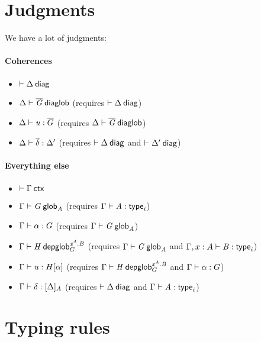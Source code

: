 \newcommand\diagbase[0]{\ensuremath{\mathord{*}}}
\newcommand\interpdiag[2]{\ensuremath{[ #1 ]_{#2}}}

\section{Judgments}

We have a lot of judgments:

\paragraph{Coherences}

\begin{itemize}
\item $\wfdiag{\Delta}$
\item $\wfdiaglob{\Delta}{\diag G}$ (requires $\wfdiag{\Delta}$)
\item $\ofdiaglob{\Delta}{u}{\diag G}$ (requires $\wfdiaglob{\Delta}{\diag G}$)
\item $\substdiaglob{\Delta}{\diag \delta}{\Delta'}$ (requires $\wfdiag{\Delta}$
  and $\wfdiag{\Delta'}$)
\end{itemize}

\paragraph{Everything else}

\begin{itemize}
\item $\wfctx{\Gamma}$
\item $\wfglob{\Gamma}{G}{}{A}$ (requires $\ofglob{\Gamma}{A}{\typ{i}}$)
\item $\ofglob{\Gamma}{\alpha}{G}$ (requires $\wfglob{\Gamma}{G}{}{A}$)
\item $\wfdepglob{\Gamma}{H}{}{x^A.B}{G}$ (requires $\wfglob{\Gamma}{G}{}{A}$
  and $\wftype{\Gamma,x:A}{B}$)
\item $\ofdepglob{\Gamma}{u}{H}{\alpha}$ (requires
  $\wfdepglob{\Gamma}{H}{}{x^A.B}{G}$ and $\ofglob{\Gamma}{\alpha}{G}$)
\item $\ofinterp{\Gamma}{\delta}{\Delta}{A}$ (requires $\wfdiag{\Delta}$ and
  $\wftype{\Gamma}{A}$)
\end{itemize}

\section{Typing rules}

